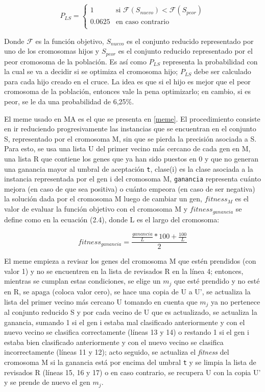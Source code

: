 \begin{equation}
P_{LS}=
\begin{cases}
1 & \text{si } \mathcal{F}(S_{nuevo}) < \mathcal{F}(S_{peor})\\
0.0625 & \text{en caso contrario}\\
\end{cases}
\end{equation}

Donde $\mathcal{F}$ es la función objetivo, $S_{nuevo}$ es el conjunto reducido representado por uno de los cromosomas hijos y $S_{peor}$ es el conjunto reducido representado por el peor cromosoma de la población. Es así como $P_{LS}$ representa la probabilidad con la cual se va a decidir si se optimiza el cromosoma hijo; $P_{LS}$ debe ser calculado para cada hijo creado en el cruce. La idea es que si el hijo es mejor que el peor cromosoma de la población, entonces vale la pena optimizarlo; en cambio, si es peor, se le da una probabilidad de 6,25\%.

El meme usado en MA es el que se presenta en \ref{meme}. El procedimiento consiste en ir reduciendo progresivamente las instancias que se encuentran en el conjunto S, representado por el cromosoma M, sin que se pierda la precisión asociada a S. Para esto, se usa una lista U del primer vecino más cercano de cada gen en M, una lista R que contiene los genes que ya han sido puestos en 0 y que no generan una ganancia mayor al umbral de aceptación \texttt{t}, clase(i) es la clase asociada a la instancia representada por el gen i del cromosoma M, \texttt{ganancia} representa cuánto mejora (en caso de que sea positiva) o cuánto empeora (en caso de ser negativa) la solución dada por el cromosoma M luego de cambiar un gen, $fitness_M$ es el valor de evaluar la función objetivo con el cromosoma M y $fitness_{ganancia}$ se define como en la ecuación (2.4), donde L es el largo del cromosoma:

\begin{equation}
fitness_{ganancia} = \frac{\frac{ganancia}{L}*100 + \frac{100}{L}}{2}
\end{equation}  

El meme empieza a revisar los genes del cromosoma M que estén prendidos (con valor 1) y no se encuentren en la lista de revisados R en la línea 4; entonces, mientras se cumplan estas condiciones, se elige un $m_j$ que esté prendido y no esté en R, se apaga (coloca valor cero), se hace una copia de U a U', se actualiza la lista del primer vecino más cercano U tomando en cuenta que $m_j$ ya no pertenece al conjunto reducido S y por cada vecino de U que es actualizado, se actualiza la ganancia, sumando 1 si el gen i estaba mal clasificado anteriormente y con el nuevo vecino se clasifica correctamente (líneas 13 y 14) o restando 1 si el gen i estaba bien clasificado anteriormente y con el nuevo vecino se clasifica incorrectamente (líneas 11 y 12); acto seguido, se actualiza el \emph{fitness} del cromosoma M si la ganancia está por encima del umbral \texttt{t} y se limpia la lista de revisados R (líneas 15, 16 y 17) o en caso contrario, se recupera U con la copia U' y se prende de nuevo el gen $m_j$.  
 
